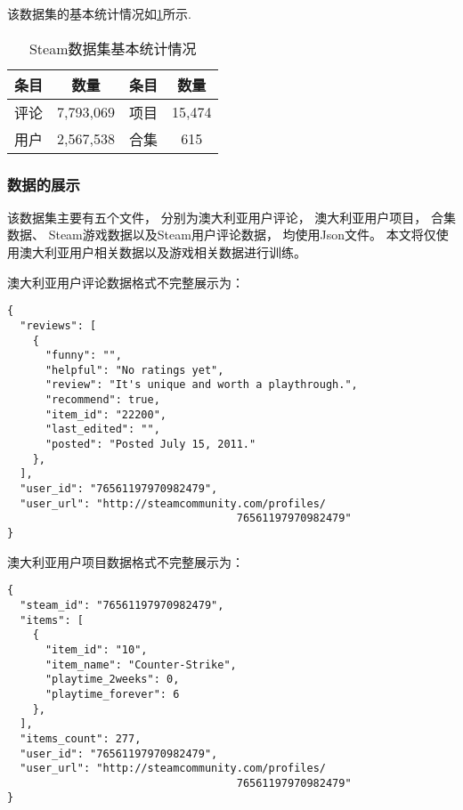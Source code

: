 该数据集的基本统计情况如\cref{tb:dataset}所示.

\begin{table}[!htbp]
  \begin{center}
    \caption{Steam数据集基本统计情况}\label{tb:dataset}
    \begin{tabular}{cccc}
      \toprule
      条目 & 数量        & 条目 & 数量     \\
      \midrule
      评论 & 7,793,069 & 项目 & 15,474 \\
      用户 & 2,567,538 & 合集 & 615    \\
      \bottomrule
    \end{tabular}
  \end{center}
\end{table}

\subsubsection{数据的展示}

该数据集主要有五个文件，
分别为澳大利亚用户评论，
澳大利亚用户项目，
合集数据、
Steam游戏数据以及Steam用户评论数据，
均使用Json文件。
本文将仅使用澳大利亚用户相关数据以及游戏相关数据进行训练。

澳大利亚用户评论数据格式不完整展示为：
\begin{verbatim}
{
  "reviews": [
    {
      "funny": "",
      "helpful": "No ratings yet",
      "review": "It's unique and worth a playthrough.",
      "recommend": true,
      "item_id": "22200",
      "last_edited": "",
      "posted": "Posted July 15, 2011."
    },
  ],
  "user_id": "76561197970982479",
  "user_url": "http://steamcommunity.com/profiles/
                                    76561197970982479"
}
\end{verbatim}

澳大利亚用户项目数据格式不完整展示为：
\begin{verbatim}
{
  "steam_id": "76561197970982479",
  "items": [
    {
      "item_id": "10",
      "item_name": "Counter-Strike",
      "playtime_2weeks": 0,
      "playtime_forever": 6
    },
  ],
  "items_count": 277,
  "user_id": "76561197970982479",
  "user_url": "http://steamcommunity.com/profiles/
                                    76561197970982479"
}
\end{verbatim}

